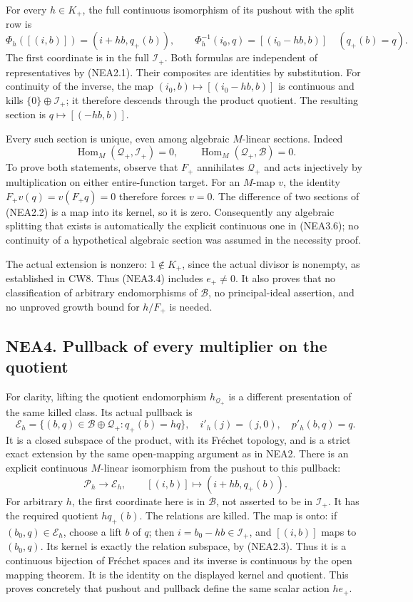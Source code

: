 For every \(h\in K_+\), the full continuous isomorphism of its pushout
with the split row is \[
\Phi_h([(i,b)])=(i+hb,q_+(b)),\qquad
\Phi_h^{-1}(i_0,q)=[(i_0-hb,b)]\quad(q_+(b)=q).
\tag{NEA3.6}
\] The first coordinate is in the full \(\mathcal I_+\). Both formulas
are independent of representatives by (NEA2.1). Their composites are
identities by substitution. For continuity of the inverse, the map
\((i_0,b)\mapsto[(i_0-hb,b)]\) is continuous and kills
\(\{0\}\oplus\mathcal I_+\); it therefore descends through the product
quotient. The resulting section is \(q\mapsto[(-hb,b)]\).

Every such section is unique, even among algebraic \(M\)-linear
sections. Indeed \[
\operatorname{Hom}_M(\mathcal Q_+,\mathcal I_+)=0,
\qquad \operatorname{Hom}_M(\mathcal Q_+,\mathcal B)=0.
\tag{NEA3.7}
\] To prove both statements, observe that \(F_+\) annihilates
\(\mathcal Q_+\) and acts injectively by multiplication on either
entire-function target. For an \(M\)-map \(v\), the identity
\(F_+v(q)=v(F_+q)=0\) therefore forces \(v=0\). The difference of two
sections of (NEA2.2) is a map into its kernel, so it is zero.
Consequently any algebraic splitting that exists is automatically the
explicit continuous one in (NEA3.6); no continuity of a hypothetical
algebraic section was assumed in the necessity proof.

The actual extension is nonzero: \(1\notin K_+\), since the actual
divisor is nonempty, as established in CW8. Thus (NEA3.4) includes
\(e_+\ne0\). It also proves that no classification of arbitrary
endomorphisms of \(\mathcal B\), no principal-ideal assertion, and no
unproved growth bound for \(h/F_+\) is needed.

\subsection{NEA4. Pullback of every multiplier on the
quotient}\label{nea4.-pullback-of-every-multiplier-on-the-quotient}

For clarity, lifting the quotient endomorphism \(h_{\mathcal Q_+}\) is a
different presentation of the same killed class. Its actual pullback is
\[
\mathcal E_h=\{(b,q)\in\mathcal B\oplus\mathcal Q_+:
q_+(b)=h q\},
\quad i'_h(j)=(j,0),\quad p'_h(b,q)=q.
\tag{NEA4.1}
\] It is a closed subspace of the product, with its Fréchet topology,
and is a strict exact extension by the same open-mapping argument as in
NEA2. There is an explicit continuous \(M\)-linear isomorphism from the
pushout to this pullback: \[
\mathcal P_h\longrightarrow\mathcal E_h,
\qquad [(i,b)]\longmapsto(i+hb,q_+(b)).
\tag{NEA4.2}
\] For arbitrary \(h\), the first coordinate here is in \(\mathcal B\),
not asserted to be in \(\mathcal I_+\). It has the required quotient
\(h q_+(b)\). The relations are killed. The map is onto: if
\((b_0,q)\in\mathcal E_h\), choose a lift \(b\) of \(q\); then
\(i=b_0-hb\in\mathcal I_+\), and \([(i,b)]\) maps to \((b_0,q)\). Its
kernel is exactly the relation subspace, by (NEA2.3). Thus it is a
continuous bijection of Fréchet spaces and its inverse is continuous by
the open mapping theorem. It is the identity on the displayed kernel and
quotient. This proves concretely that pushout and pullback define the
same scalar action \(h e_+\).

